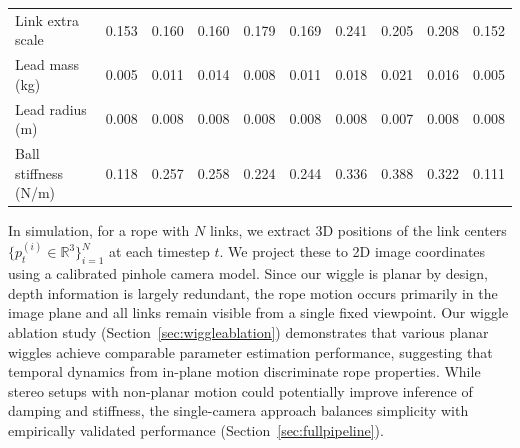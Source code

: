 \documentclass[conference]{IEEEtran}
\begin{document}
\begin{table}[t]
{\begin{tabular}{l|c|c|c|c|c|c|c|c|c}
Link extra scale & \cellcolor{green!40}0.153 & \cellcolor{yellow!20}0.160 & \cellcolor{yellow!20}0.160 & \cellcolor{yellow!30}0.179 & \cellcolor{yellow!30}0.169 & \cellcolor{red!50}0.241 & \cellcolor{orange!30}0.205 & \cellcolor{red!30}0.208 & \cellcolor{green!60}0.152 \\
Lead mass (kg) & \cellcolor{green!60}0.005 & \cellcolor{yellow!20}0.011 & \cellcolor{yellow!30}0.014 & \cellcolor{green!30}0.008 & \cellcolor{yellow!20}0.011 & \cellcolor{orange!30}0.018 & \cellcolor{red!30}0.021 & \cellcolor{red!50}0.016 & \cellcolor{green!60}0.005 \\
Lead radius (m) & \cellcolor{green!20}0.008 & \cellcolor{green!20}0.008 & \cellcolor{green!20}0.008 & \cellcolor{green!20}0.008 & \cellcolor{green!20}0.008 & \cellcolor{green!20}0.008 & \cellcolor{green!60}0.007 & \cellcolor{green!20}0.008 & \cellcolor{green!20}0.008 \\
Ball stiffness (N/m) & \cellcolor{green!40}0.118 & \cellcolor{orange!30}0.257 & \cellcolor{red!30}0.258 & \cellcolor{yellow!30}0.224 & \cellcolor{yellow!30}0.244 & \cellcolor{orange!30}0.336 & \cellcolor{red!50}0.388 & \cellcolor{red!30}0.322 & \cellcolor{green!60}0.111 \\
\bottomrule
\end{tabular}}
\end{table}

In simulation, for a rope with $N$ links, we extract 3D positions of the link centers $\{p_t^{(i)} \in \mathbb{R}^3\}_{i=1}^N$ at each timestep $t$. We project these to 2D image coordinates using a calibrated pinhole camera model. Since our wiggle is planar by design, depth information is largely redundant, the rope motion occurs primarily in the image plane and all links remain visible from a single fixed viewpoint. Our wiggle ablation study (Section~\ref{sec:wiggleablation}) demonstrates that various planar wiggles achieve comparable parameter estimation performance, suggesting that temporal dynamics from in-plane motion discriminate rope properties. While stereo setups with non-planar motion could potentially improve inference of damping and stiffness, the single-camera approach balances simplicity with empirically validated performance (Section~\ref{sec:fullpipeline}).
\end{document}
